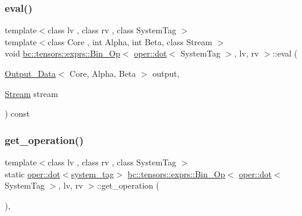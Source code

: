 \subsubsection{\texorpdfstring{eval()}{eval()}}
{\footnotesize\ttfamily template$<$class lv , class rv , class System\+Tag $>$ \\
template$<$class Core , int Alpha, int Beta, class Stream $>$ \\
void \hyperlink{structbc_1_1tensors_1_1exprs_1_1Bin__Op}{bc\+::tensors\+::exprs\+::\+Bin\+\_\+\+Op}$<$ \hyperlink{structbc_1_1oper_1_1dot}{oper\+::dot}$<$ System\+Tag $>$, lv, rv $>$\+::eval (\begin{DoxyParamCaption}\item[{\hyperlink{structbc_1_1tensors_1_1exprs_1_1Output__Data}{Output\+\_\+\+Data}$<$ Core, Alpha, Beta $>$}]{output,  }\item[{\hyperlink{classbc_1_1streams_1_1Stream}{Stream}}]{stream }\end{DoxyParamCaption}) const\hspace{0.3cm}{\ttfamily [inline]}}

\mbox{\label{structbc_1_1tensors_1_1exprs_1_1Bin__Op_3_01oper_1_1dot_3_01SystemTag_01_4_00_01lv_00_01rv_01_4_a75d2463548379d223cd1c3e6133f5bd2}} 
\subsubsection{\texorpdfstring{get\+\_\+operation()}{get\_operation()}}
{\footnotesize\ttfamily template$<$class lv , class rv , class System\+Tag $>$ \\
static \hyperlink{structbc_1_1oper_1_1dot}{oper\+::dot}$<$\hyperlink{structbc_1_1tensors_1_1exprs_1_1Bin__Op_3_01oper_1_1dot_3_01SystemTag_01_4_00_01lv_00_01rv_01_4_aac42309fcd782d98f3d908ce98defba8}{system\+\_\+tag}$>$ \hyperlink{structbc_1_1tensors_1_1exprs_1_1Bin__Op}{bc\+::tensors\+::exprs\+::\+Bin\+\_\+\+Op}$<$ \hyperlink{structbc_1_1oper_1_1dot}{oper\+::dot}$<$ System\+Tag $>$, lv, rv $>$\+::get\+\_\+operation (\begin{DoxyParamCaption}{ }\end{DoxyParamCaption})\hspace{0.3cm}{\ttfamily [inline]}, {\ttfamily [static]}}



